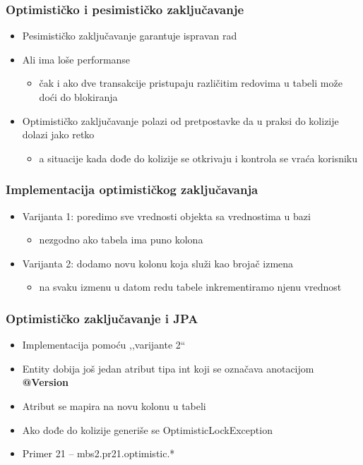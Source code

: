 \documentclass[compress]{beamer}
\begin{document}
\begin{frame}
  \frametitle{Optimističko i pesimističko zaključavanje}
  \begin{itemize}
    \item Pesimističko zaključavanje garantuje ispravan rad
    \item Ali ima loše performanse
    \begin{itemize}
      \item čak i ako dve transakcije pristupaju različitim redovima u tabeli može doći do blokiranja
    \end{itemize}
    \item Optimističko zaključavanje polazi od pretpostavke da u praksi do kolizije dolazi jako retko
    \begin{itemize}
      \item a situacije kada dođe do kolizije se otkrivaju i kontrola se vraća korisniku
    \end{itemize}
  \end{itemize}
\end{frame}
\begin{frame}
  \frametitle{Implementacija optimističkog zaključavanja}
  \begin{itemize}
    \item Varijanta 1: poredimo sve vrednosti objekta sa vrednostima u bazi
    \begin{itemize}
      \item nezgodno ako tabela ima puno kolona
    \end{itemize}
    \item Varijanta 2: dodamo novu kolonu koja služi kao brojač izmena
    \begin{itemize}
      \item na svaku izmenu u datom redu tabele inkrementiramo njenu vrednost
    \end{itemize}
  \end{itemize}
\end{frame}
\begin{frame}
  \frametitle{Optimističko zaključavanje i JPA}
  \begin{itemize}
    \item Implementacija pomoću ,,varijante 2``
    \item Entity dobija još jedan atribut tipa int koji se označava anotacijom \textbf{@Version}
    \item Atribut se mapira na novu kolonu u tabeli
    \item Ako dođe do kolizije generiše se OptimisticLockException
    \item Primer 21 -- mbs2.pr21.optimistic.*
  \end{itemize}
\end{frame}
\end{document}
